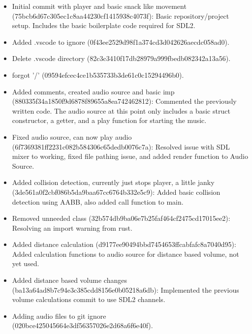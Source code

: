 \documentclass{article}
\begin{document}
\begin{itemize}

    \item Initial commit with player and basic snack like movement \\ (75bcb6d67c305ec1c8aa44230cf1415938c4073f): Basic repository/project setup. Includes the basic boilerplate code required for SDL2.

    \item Added .vscode to ignore (0f43ee2529d98f1a374cd3d042626aecdc058ad0).

    \item Delete .vscode directory (82c3c3410f17db28979a999fbedb082342a13a56).

    \item forgot '/' (09594efcec4ce1b535733b3de61c0c15294496b0).

    \item Added comments, created audio source and basic imp \\ (880335f34a1850f9d6878f89655a8ea742462812): Commented the previously written code. The audio source at this point only includes a basic struct constructor, a getter, and a play function for starting the music.

    \item Fixed audio source, can now play audio (6f7369381ff2231c082b584306c65dedb0076c7a): Resolved issue with SDL mixer to working, fixed file pathing issue, and added render function to Audio Source.

    \item Added collision detection, currently just stops player, a little janky \\ (3de561a0f2cbf086b5da9baa67cc6764b332e5c9): Added basic collision detection using AABB, also added call function to main.

    \item Removed unneeded class (32b574db9ba06e7b25faf464cf2475cd17015ee2): Resolving an import warning from rust.

    \item Added distance calculation (d9177ee90494bbd7454653ffcabfafc8a7040d95): Added calculation functions to audio source for distance based volume, not yet used.

    \item Added distance based volume changes (ba13a64ad8b7c94e3c385cdd8156e0b05218a6db): Implemented the previous volume calculations commit to use SDL2 channels.

    \item Adding audio files to git ignore (020bce425045664e3df56357026e2d68a6f6e40f).


\end{itemize}
\end{document}
